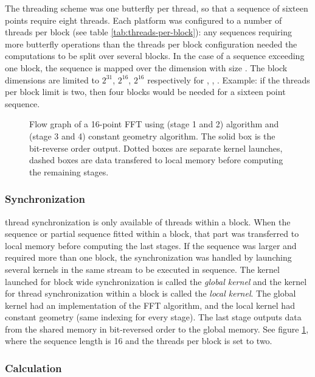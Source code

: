 The threading scheme was one butterfly per thread, so that a sequence of sixteen points require eight threads. Each platform was configured to a number of threads per block (see table \ref{tab:threads-per-block}): any sequences requiring more butterfly operations than the threads per block configuration needed the computations to be split over several blocks. In the case of a sequence exceeding one block, the sequence is mapped over the  dimension with size . The block dimensions are limited to $2^{31}$, $2^{16}$, $2^{16}$ respectively for , , . Example: if the threads per block limit is two, then four blocks would be needed for a sixteen point sequence.

\begin{figure}
	
	\caption{Flow graph of a 16-point FFT using (stage 1 and 2) {\CTALG} algorithm and (stage 3 and 4) constant geometry algorithm. The solid box is the bit-reverse order output. Dotted boxes are separate kernel launches, dashed boxes are data transfered to local memory before computing the remaining stages.}
	\label{fig:flowgraph-16}
\end{figure}

\subsubsection{Synchronization}

\Gls{thread} synchronization is only available of \glspl{thread} within a \gls{block}. When the sequence or partial sequence fitted within a block, that part was transferred to local memory before computing the last stages. If the sequence was larger and required more than one block, the synchronization was handled by launching several kernels in the same stream to be executed in sequence. The kernel launched for block wide synchronization is called the \emph{global kernel} and the kernel for thread synchronization within a block is called the \emph{local kernel}. The global kernel had an implementation of the {\CTALG} \gls{FFT} algorithm, and the local kernel had constant geometry (same indexing for every stage). The last stage outputs data from the shared memory in bit-reversed order to the global memory. See figure \ref{fig:flowgraph-16}, where the sequence length is 16 and the threads per block is set to two.

\subsubsection{Calculation}

